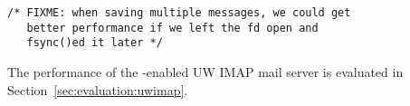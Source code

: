 \vspace{-0.5\baselineskip}
\begin{scriptsize}
\begin{verbatim}
/* FIXME: when saving multiple messages, we could get
   better performance if we left the fd open and
   fsync()ed it later */
\end{verbatim}
\end{scriptsize}
\vspace{-0.5\baselineskip}

The performance of the \opgroup{}-enabled UW IMAP mail server is
evaluated in Section~\ref{sec:evaluation:uwimap}.
